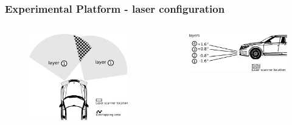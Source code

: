 \documentclass{beamer}
\begin{document}
	\begin{frame}
		\frametitle{Experimental Platform - laser configuration}	



		 \begin{columns}[t]
		  \begin{column}{5cm}

		  \begin{figure}[h]
			\center
			\includegraphics[scale=0.27]{../img/fig:demonstrator:superior:overlap}
		  \end{figure}   

		  \end{column}

		  \begin{column}{5cm}
		 \begin{figure}[h]
			\center
			\includegraphics[scale=0.27]{../img/fig:demonstrator:lateral}
		\end{figure}		  
		  \end{column}
		 \end{columns} 	
	
	\end{frame}
\end{document}
